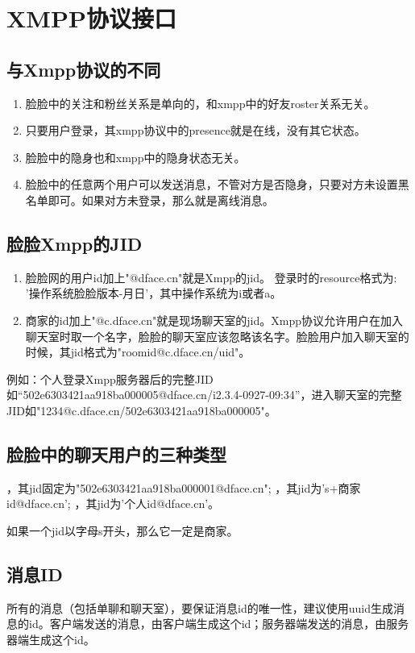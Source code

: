 \section{XMPP协议接口}


\subsection{与Xmpp协议的不同}

\begin{enumerate}
\item 脸脸中的关注和粉丝关系是单向的，和xmpp中的好友roster关系无关。
\item 只要用户登录，其xmpp协议中的presence就是在线，没有其它状态。
\item 脸脸中的隐身也和xmpp中的隐身状态无关。
\item 脸脸中的任意两个用户可以发送消息，不管对方是否隐身，只要对方未设置黑名单即可。如果对方未登录，那么就是离线消息。
\end{enumerate}

\subsection{脸脸Xmpp的JID}
\begin{enumerate}
\item 脸脸网的用户id加上"@dface.cn"就是Xmpp的jid。
登录时的resource格式为: '操作系统脸脸版本-月日'，其中操作系统为i或者a。
\item 商家的id加上"@c.dface.cn"就是现场聊天室的jid。Xmpp协议允许用户在加入聊天室时取一个名字，脸脸的聊天室应该忽略该名字。脸脸用户加入聊天室的时候，其jid格式为"roomid@c.dface.cn/uid"。
\end{enumerate}
例如：个人登录Xmpp服务器后的完整JID如“502e6303421aa918ba000005@dface.cn/i2.3.4-0927-09:34”，进入聊天室的完整JID如"1234@c.dface.cn/502e6303421aa918ba000005"。


\subsection{脸脸中的聊天用户的三种类型}

\begin{enumerate}
，其jid固定为"502e6303421aa918ba000001@dface.cn";
，其jid为's+商家id@dface.cn';
，其jid为'个人id@dface.cn'。
\end{enumerate}
如果一个jid以字母s开头，那么它一定是商家。




\subsection{消息ID}
所有的消息（包括单聊和聊天室），要保证消息id的唯一性，建议使用uuid生成消息的id。客户端发送的消息，由客户端生成这个id；服务器端发送的消息，由服务器端生成这个id。

